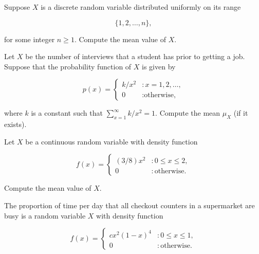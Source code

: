 \documentclass[12pt,reqno]{amsart}
\begin{document}
\bigskip
\prob Suppose $X$ is a discrete random variable distributed uniformly on its range
    
	\[
	\{1,2,\ldots,n\},
	\]

for some integer $n\geq 1$. Compute the mean value of $X$.\vfill













\newpage
\prob Let $X$ be the number of interviews that a student has prior to getting a job. Suppose that the probability function of $X$ is given by

	\[
	p(x) = \begin{cases}
	k/x^2 & : x=1,2,\ldots, \\
	0 & : \text{otherwise,}
	\end{cases}
	\]

where $k$ is a constant such that $\sum_{x=1}^\infty k/x^2 = 1$. Compute the mean $\mu_X$ (if it exists).\vfill



















\bigskip
\prob Let $X$ be a continuous random variable with density function
	
	\[
	f(x) = \begin{cases}
	(3/8)x^2 & : 0 \leq x \leq 2, \\
	0 & : \text{otherwise}.
	\end{cases}
	\]

Compute the mean value of $X$.\vfill














\bigskip
\prob The proportion of time per day that all checkout counters in a supermarket are busy is a random variable $X$ with density function

	\[
	f(x) = \begin{cases}
	cx^2(1-x)^4 & : 0 \leq x \leq 1, \\
	0 & : \text{otherwise}.
	\end{cases}
	\]
\end{document}
